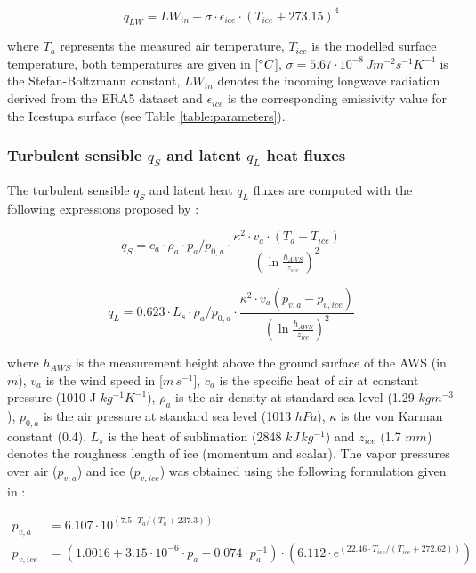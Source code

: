 \documentclass[utf8]{frontiersSCNS} %
\begin{document}
\begin{equation} q_{LW}= LW_{in}-\sigma \cdot \epsilon_{ice} \cdot {(T_{ice}+ 273.15)}^4
\label{eqn:LW} \end{equation}

where $T_a$ represents the measured air temperature, $T_{ice}$ is the modelled surface temperature, both temperatures
are given in [$\degree C$], $\sigma=5.67\cdot 10^{-8}\,Jm^{-2}s^{-1}K^{-4}$ is the Stefan-Boltzmann constant, $LW_{in}$
denotes the incoming longwave radiation derived from the ERA5 dataset and $\epsilon_{ice}$ is the corresponding
emissivity value for the Icestupa surface (see Table \ref{table:parameters}).

\subsubsection{Turbulent sensible \texorpdfstring{$q_{S}$}{Lg} and latent \texorpdfstring{$q_{L}$}{Lg} heat fluxes }

The turbulent sensible $q_{S}$ and latent heat $q_{L}$ fluxes are computed with the following expressions proposed by
\cite{Garratt_1992}:

\begin{equation} q_{S}=c_{a} \cdot \rho_{a} \cdot p_{a}/p_{0,a} \cdot \frac{\kappa^2 \cdot v_a \cdot
(T_a-T_{ice})}{{(\ln{\frac{h_{AWS}}{z_{ice}}})}^2} \label{eqn:qs} \end{equation}

\begin{equation} q_{L}=0.623 \cdot L_s \cdot \rho_{a}/p_{0,a} \cdot \frac{\kappa^2 \cdot
v_a(p_{v,a}-p_{v,ice})}{{(\ln{\frac{h_{AWS}}{z_{ice}}})}^2} \end{equation}

where $h_{AWS}$ is the measurement height above the ground surface of the AWS (in $m$), $v_a$ is the wind speed in
[$m\,s^{-1}$], $c_a$ is the specific heat of air at constant pressure (1010 J $kg^{-1} K^{-1}$), $\rho_{a}$ is the air
density at standard sea level (1.29 $kg m^{-3}$), $p_{0,a}$ is the air pressure at standard sea level (1013 $hPa$),
$\kappa$ is the von Karman constant (0.4), $L_s$ is the heat of sublimation (2848 $kJ\, kg^{-1}$) and $z_{ice}$ (1.7
$mm$) denotes the roughness length of ice (momentum and scalar).  The vapor pressures over air ($p_{v,a}$) and ice
($p_{v,ice}$) was obtained using the following formulation given in \cite{WMO_2018}:

\begin{equation} \begin{split} p_{v,a}&=6.107 \cdot 10^{(7.5 \cdot T_a / (T_a + 237.3))}\\ p_{v,ice}&=(1.0016 +
3.15\cdot10^{-6}\cdot p_{a}-0.074\cdot p_{a}^{-1})\cdot(6.112 \cdot e^{(22.46 \cdot T_{ice} / (T_{ice} + 272.62))})
\end{split} \label{eqn:vp} \end{equation}
\end{document}
